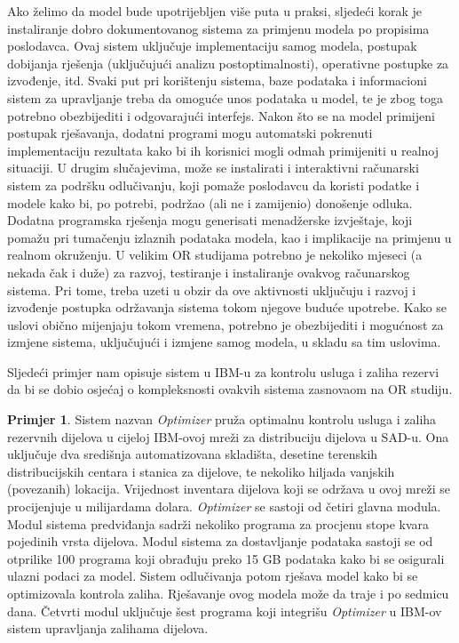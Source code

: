 \documentclass[b5paper, utf8, 11pt, colorlinks]{book}
\theoremstyle{definition}
\newtheorem{primjer}{Primjer}[chapter]
\begin{document}
 Ako želimo da model bude upotrijebljen više puta u praksi, sljedeći  korak je instaliranje dobro dokumentovanog sistema za primjenu modela po propisima poslodavca. Ovaj sistem uključuje implementaciju samog modela, postupak dobijanja rješenja (uključujući analizu postoptimalnosti), operativne postupke za izvođenje, itd. %
 Svaki put pri korištenju sistema, baze podataka i informacioni sistem za upravljanje treba da omoguće unos podataka u model, te je zbog toga potrebno obezbijediti i odgovarajući interfejs. Nakon što se na model primijeni postupak rješavanja, dodatni  programi mogu automatski pokrenuti implementaciju rezultata kako bi ih korisnici mogli odmah primijeniti u realnoj situaciji. U drugim slučajevima, može se instalirati i interaktivni računarski sistem  za podršku odlučivanju, koji pomaže poslodavcu da koristi podatke i modele kako bi, po potrebi, podržao (ali ne i zamijenio)   donošenje odluka. Dodatna programska rješenja mogu generisati menadžerske izvještaje, koji pomažu pri tumačenju izlaznih podataka modela, kao i implikacije na primjenu u realnom okruženju.  U velikim OR studijama potrebno je nekoliko mjeseci (a nekada čak i duže) za razvoj, testiranje i instaliranje ovakvog računarskog sistema. Pri tome, treba uzeti u obzir da ove aktivnosti uključuju i razvoj i izvođenje postupka održavanja sistema  tokom njegove buduće upotrebe. Kako se uslovi obično mijenjaju tokom vremena, potrebno je obezbijediti i mogućnost za  izmjene sistema, uključujući i izmjene samog modela, u skladu sa tim uslovima.  

 Sljedeći primjer nam opisuje sistem u IBM-u za kontrolu usluga i zaliha rezervi da bi se dobio osjećaj o kompleksnosti ovakvih sistema zasnovaom na OR studiju. 

 \begin{primjer}\label{primjer:IMBOptimizer}
 Sistem nazvan \emph{Optimizer} pruža optimalnu kontrolu usluga i zaliha rezervnih dijelova u cijeloj IBM-ovoj mreži za distribuciju dijelova u SAD-u. Ona uključuje dva središnja
 automatizovana skladišta, desetine terenskih distribucijskih centara i stanica za dijelove, te nekoliko hiljada vanjskih (povezanih) lokacija. Vrijednost inventara dijelova koji se održava u ovoj mreži se procijenjuje u milijardama dolara. \emph{Optimizer} se sastoji od četiri glavna modula. Modul sistema predviđanja sadrži nekoliko programa za procjenu stope kvara pojedinih vrsta dijelova. Modul sistema za dostavljanje podataka sastoji se od otprilike 100 programa koji    obrađuju
 preko 15 GB podataka kako bi se osigurali ulazni podaci za model. Sistem odlučivanja potom rješava model kako bi se optimizovala kontrola zaliha. Rješavanje ovog modela može da traje i po sedmicu dana. Četvrti modul uključuje šest programa koji integrišu \emph{Optimizer} u IBM-ov sistem upravljanja zalihama dijelova. %
  \end{primjer} 
\end{document}

